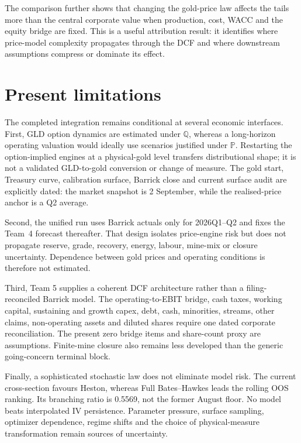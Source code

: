The comparison further shows that changing the gold-price law affects the
tails more than the central corporate value when production, cost, WACC and
the equity bridge are fixed. This is a useful attribution result: it identifies
where price-model complexity propagates through the DCF and where downstream
assumptions compress or dominate its effect.

\section*{Present limitations}

The completed integration remains conditional at several economic interfaces.
First, GLD option dynamics are estimated under \(\mathbb Q\), whereas a
long-horizon operating valuation would ideally use scenarios justified under
\(\mathbb P\). Restarting the option-implied engines at a physical-gold level
transfers distributional shape; it is not a validated GLD-to-gold conversion
or change of measure. The gold start, Treasury curve, calibration surface,
Barrick close and current surface audit are explicitly dated: the market snapshot is 2 September, while the realised-price anchor is a Q2 average.

Second, the unified run uses Barrick actuals only for 2026Q1--Q2 and fixes the
Team~4 forecast thereafter. That design isolates price-engine risk but does not propagate reserve,
grade, recovery, energy, labour, mine-mix or closure uncertainty. Dependence
between gold prices and operating conditions is therefore not estimated.

Third, Team 5 supplies a coherent DCF architecture rather than a
filing-reconciled Barrick model. The operating-to-EBIT bridge, cash taxes,
working capital, sustaining and growth capex, debt, cash, minorities, streams,
other claims, non-operating assets and diluted shares require one dated
corporate reconciliation. The present zero bridge items and share-count proxy
are assumptions. Finite-mine closure also remains less developed than the
generic going-concern terminal block.

Finally, a sophisticated stochastic law does not eliminate model risk. The
current cross-section favours Heston, whereas Full Bates--Hawkes leads the rolling OOS ranking. Its branching ratio is 0.5569, not the former August floor. No model beats interpolated IV persistence. Parameter pressure,
surface sampling, optimizer dependence, regime shifts and the choice of
physical-measure transformation remain sources of uncertainty.

